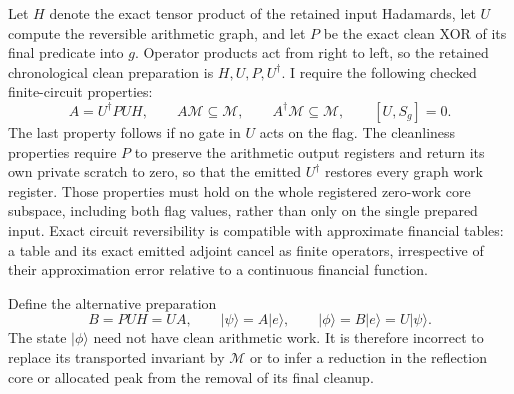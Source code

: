 \documentclass[11pt]{article}
\begin{document}
Let $H$ denote the exact tensor product of the retained input
Hadamards, let $U$ compute the reversible arithmetic graph, and let
$P$ be the exact clean XOR of its final predicate into $g$. Operator
products act from right to left, so the retained chronological clean
preparation is $H,U,P,U^\dagger$. I require the following checked
finite-circuit properties:
\begin{equation}
 A=U^\dagger P U H,\qquad
 A\mathcal M\subseteq\mathcal M,\qquad
 A^\dagger\mathcal M\subseteq\mathcal M,\qquad
 [U,S_g]=0.
 \label{eq:conjugation-assumptions}
\end{equation}
The last property follows if no gate in $U$ acts on the flag. The
cleanliness properties require $P$ to preserve the arithmetic output
registers and return its own private scratch to zero, so that the
emitted $U^\dagger$ restores every graph work register. Those properties
must hold on the whole registered zero-work core subspace, including
both flag values, rather than only on the single prepared input.
Exact circuit reversibility is compatible with approximate financial
tables: a table and its exact emitted adjoint cancel as finite
operators, irrespective of their approximation error relative to a
continuous financial function.

Define the alternative preparation
\begin{equation}
 B=P U H=U A,\qquad
 |\psi\rangle=A|e\rangle,\qquad
 |\phi\rangle=B|e\rangle=U|\psi\rangle.
 \label{eq:conjugation-preparations}
\end{equation}
The state $|\phi\rangle$ need not have clean arithmetic work. It is
therefore incorrect to replace its transported invariant by
$\mathcal M$ or to infer a reduction in the reflection core or allocated
peak from the removal of its final cleanup.
\end{document}

